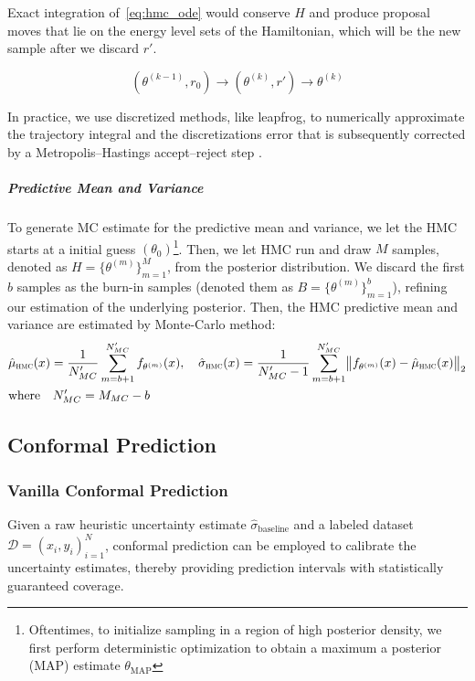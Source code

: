 \documentclass[preprint,12pt]{elsarticle}
\begin{document}
Exact integration of~\eqref{eq:hmc_ode} would conserve $H$ and produce
proposal moves that lie on the energy level sets of the Hamiltonian, which will be the new sample after we discard $r'$. 

\begin{equation}
    (\theta^{(k-1)}, r_0) \rightarrow (\theta^{(k)}, r') \rightarrow \theta^{(k)}
\end{equation}

\noindent
In practice, we use discretized methods, like leapfrog, to numerically approximate the trajectory integral and the discretizations error that is subsequently corrected by a Metropolis–Hastings accept–reject step .

\subparagraph{Predictive Mean and Variance}
To generate MC estimate for the predictive mean and variance, we let the HMC starts at a initial guess $(\theta_0)$\footnote{Oftentimes, to initialize sampling in a region of high posterior density, we first perform deterministic optimization to obtain a maximum a posterior (MAP) estimate $\theta_{\text{MAP}}$}. Then, we let HMC run and draw $M$ samples, denoted as $H = \{\theta^{(m)}\}_{m=1}^M$, from the posterior distribution. We discard the first $b$ samples as the burn-in samples (denoted them as $B = \{\theta^{(m)}\}_{m=1}^b$), refining our estimation of the underlying posterior. Then, the HMC predictive mean and variance are estimated by Monte-Carlo method:
\begin{equation}
    \begin{aligned}
        &\hat\mu_{\textsc{hmc}}(x)
        =
        \frac{1}{N_{MC}'}\sum_{m=b+1}^{N_{MC}'} f_{\theta^{(m)}}(x),
        \quad
        \hat\sigma_{\textsc{hmc}}(x)
        =
        \frac{1}{N_{MC}'-1}\sum_{m=b+1}^{N_{MC}'}
        \bigl\| f_{\theta^{(m)}}(x) - \hat\mu_{\textsc{hmc}}(x) \bigr\|_{2} \\
        &\text{where} \quad
        N_{MC}' = M_{MC} - b
    \end{aligned}
\label{eq:hmc_pred_mean_var} 
\end{equation}


\subsection{Conformal Prediction}
\label{sec:sub:cp}
\subsubsection{Vanilla Conformal Prediction}
\label{sec:sub:sub:vanilla_cp}
Given a raw heuristic uncertainty estimate $\hat \sigma_{\text{baseline}}$ and a labeled dataset $\mathcal{D} = {(x_i, y_i)}_{i=1}^{N}$, conformal prediction can be employed to calibrate the uncertainty estimates, thereby providing prediction intervals with statistically guaranteed coverage.
\end{document}
